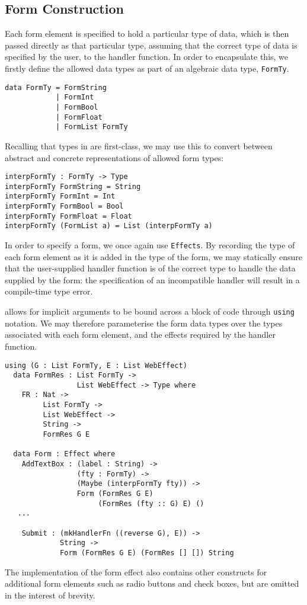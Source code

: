 \documentclass[preprint]{sigplanconf}
\begin{document}
\subsection{Form Construction}
\label{formcons}
Each form element is specified to hold a particular type of data, which is then passed directly as that particular type, assuming that the correct type of data is specified by the user, to the handler function. In order to encapsulate this, we firstly define the allowed data types as part of an algebraic data type, \texttt{FormTy}.
\begin{Verbatim}
data FormTy = FormString
            | FormInt
            | FormBool
            | FormFloat
            | FormList FormTy 
\end{Verbatim}
Recalling that types in \idris{} are first-class, we may use this to convert between abstract and concrete representations of allowed form types:
\begin{Verbatim}
interpFormTy : FormTy -> Type
interpFormTy FormString = String
interpFormTy FormInt = Int
interpFormTy FormBool = Bool
interpFormTy FormFloat = Float
interpFormTy (FormList a) = List (interpFormTy a)
\end{Verbatim}
%
In order to specify a form, we once again use \texttt{Effects}. By recording
the type of each form element as it is added in the type of the form, we may
statically ensure that the user-supplied handler function is of the correct
type to handle the data supplied by the form: the specification of an
incompatible handler will result in a compile-time type error.

\idris{} allows for implicit arguments to be bound across a block of code
through \texttt{using} notation. We may therefore parameterise the 
form data types over
the types associated with each form element, and the effects required by the
handler function.

\begin{Verbatim}
using (G : List FormTy, E : List WebEffect)
  data FormRes : List FormTy -> 
                 List WebEffect -> Type where
    FR : Nat -> 
         List FormTy -> 
         List WebEffect -> 
         String -> 
         FormRes G E
  
  data Form : Effect where
    AddTextBox : (label : String) -> 
                 (fty : FormTy) -> 
                 (Maybe (interpFormTy fty)) -> 
                 Form (FormRes G E) 
                      (FormRes (fty :: G) E) () 
   ...
   
    Submit : (mkHandlerFn ((reverse G), E)) ->
             String -> 
             Form (FormRes G E) (FormRes [] []) String
\end{Verbatim}
The implementation of the form effect also contains other constructs for
additional form elements such as radio buttons and check boxes, but are omitted
in the interest of brevity.
\end{document}

